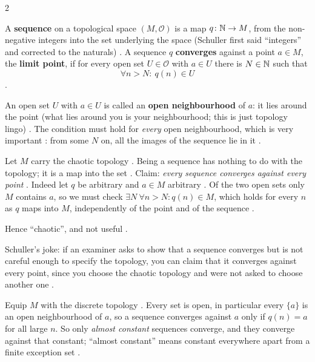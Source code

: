 \begin{paracol}{2}
\begin{definition}\label{def:to-conv}
A \textbf{sequence} on a topological space $(M,\mathcal O)$ is a map $q\colon\mathbb{N}\to M$, from the non-negative integers into the
set underlying the space (Schuller first said ``integers'' and corrected to the naturals) . A sequence
$q$ \textbf{converges} against a point $a\in M$, the \textbf{limit point}, if for every open set $U\in\mathcal O$ with $a\in U$
there is $N\in\mathbb{N}$ such that
\[
  \forall n>N\colon\ q(n)\in U
\]
.
\end{definition}
An open set $U$ with $a\in U$ is called an \textbf{open neighbourhood} of $a$: it lies around the point (what lies around you is
your neighbourhood; this is just topology lingo) . The condition must hold for \emph{every} open neighbourhood,
which is very important : from some $N$ on, all the images of the sequence lie in it
.

\begin{example}\label{ex:to-conv-chaotic}
Let $M$ carry the chaotic topology . Being a sequence has nothing to do with the topology; it is a map into the
set . Claim: \emph{every sequence converges against every point} . Indeed let $q$ be arbitrary and
$a\in M$ arbitrary . Of the two open sets only $M$ contains $a$, so we must check $\exists N\ \forall n>N\colon q(n)\in M$,
which holds for every $n$ as $q$ maps into $M$, independently of the point and of the sequence
.
\end{example}
Hence ``chaotic'', and not useful .
\begin{aside}
Schuller's joke: if an examiner asks to show that a sequence converges but is not careful enough to specify the topology, you
can claim that it converges against every point, since you choose the chaotic topology and were not asked to choose another one
.
\end{aside}

\begin{example}\label{ex:to-conv-discrete}
Equip $M$ with the discrete topology . Every set is open, in particular every $\{a\}$ is an open
neighbourhood of $a$, so a sequence converges against $a$ only if $q(n)=a$ for all large $n$. So only \emph{almost constant}
sequences converge, and they converge against that constant; ``almost constant'' means constant everywhere apart from a finite
exception set .
\end{example}


\end{paracol}
